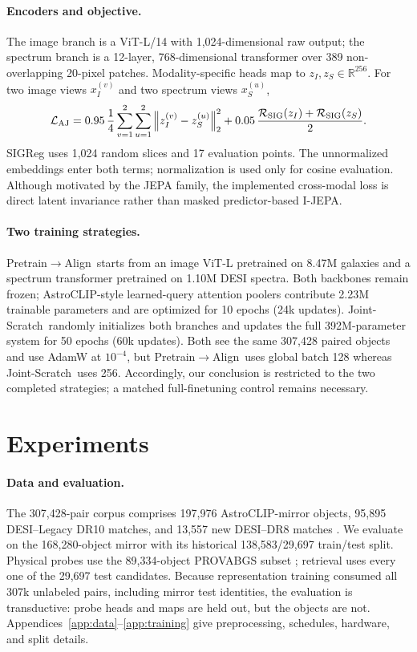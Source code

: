 \documentclass{article}
\newcommand{\prealign}{Pretrain$\rightarrow$Align}
\newcommand{\joint}{Joint-Scratch}
\begin{document}
\paragraph{Encoders and objective.}
The image branch is a ViT-L/14 with 1,024-dimensional raw output; the spectrum
branch is a 12-layer, 768-dimensional transformer over 389 non-overlapping
20-pixel patches.
Modality-specific heads map to $z_I,z_S\in\mathbb R^{256}$.
For two image views $x_I^{(v)}$ and two spectrum views $x_S^{(u)}$,
\begin{equation}
\mathcal L_{\rm AJ}
=0.95\,\frac{1}{4}\sum_{v=1}^{2}\sum_{u=1}^{2}
\left\lVert z_I^{(v)}-z_S^{(u)}\right\rVert_2^2
+0.05\,\frac{\mathcal R_{\rm SIG}(z_I)+
\mathcal R_{\rm SIG}(z_S)}{2}.
\label{eq:astrojepa}
\end{equation}
SIGReg uses 1,024 random slices and 17 evaluation points.
The unnormalized embeddings enter both terms; normalization is used only for
cosine evaluation.
Although motivated by the JEPA family, the implemented cross-modal loss is
direct latent invariance rather than masked predictor-based I-JEPA.

\paragraph{Two training strategies.}
\prealign\ starts from an image ViT-L pretrained on 8.47M galaxies and a
spectrum transformer pretrained on 1.10M DESI spectra.
Both backbones remain frozen; AstroCLIP-style learned-query attention poolers
contribute 2.23M trainable parameters and are optimized for 10 epochs
(24k updates).
\joint\ randomly initializes both branches and updates the full 392M-parameter
system for 50 epochs (60k updates).
Both see the same 307,428 paired objects and use AdamW at $10^{-4}$, but
\prealign\ uses global batch 128 whereas \joint\ uses 256.
Accordingly, our conclusion is restricted to the two completed strategies;
a matched full-finetuning control remains necessary.

\section{Experiments}
\label{sec:experiments}

\paragraph{Data and evaluation.}
The 307,428-pair corpus comprises 197,976 AstroCLIP-mirror objects,
95,895 DESI--Legacy DR10 matches, and 13,557 new DESI--DR8 matches
\citep{desi2024edr,dey2019legacy}.
We evaluate on the 168,280-object mirror with its historical
138,583/29,697 train/test split.
Physical probes use the 89,334-object PROVABGS subset
\citep{hahn2023provabgs}; retrieval uses every one of the 29,697 test
candidates.
Because representation training consumed all 307k unlabeled pairs, including
mirror test identities, the evaluation is transductive: probe heads and maps
are held out, but the objects are not.
Appendices~\ref{app:data}--\ref{app:training} give preprocessing, schedules,
hardware, and split details.
\end{document}
